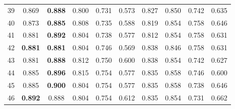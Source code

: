 \begin{table}[]
\begin{tabular}{|c|ccccccccc|}
39   & 0.869                            & \textbf{0.888}               & 0.800                              & 0.731                             & 0.573                    & 0.827                             & 0.850                             & 0.742                            & 0.635                       \\ \cline{1-1}
40   & 0.873                            & \textbf{0.885}               & 0.808                              & 0.735                             & 0.588                    & 0.819                             & 0.854                             & 0.758                            & 0.646                       \\ \cline{1-1}
41   & 0.881                            & \textbf{0.892}               & 0.804                              & 0.738                             & 0.577                    & 0.812                             & 0.854                             & 0.758                            & 0.631                       \\ \cline{1-1}
42   & \textbf{0.881}                   & \textbf{0.881}               & 0.804                              & 0.746                             & 0.569                    & 0.838                             & 0.846                             & 0.758                            & 0.631                       \\ \hline
43   & 0.881                            & \textbf{0.888}               & 0.812                              & 0.750                             & 0.600                    & 0.838                             & 0.854                             & 0.742                            & 0.627                       \\ \cline{1-1}
44   & 0.885                            & \textbf{0.896}               & 0.815                              & 0.754                             & 0.577                    & 0.835                             & 0.858                             & 0.746                            & 0.600                       \\ \cline{1-1}
45   & 0.885                            & \textbf{0.900}               & 0.804                              & 0.754                             & 0.577                    & 0.835                             & 0.858                             & 0.738                            & 0.646                       \\ \cline{1-1}
46   & \textbf{0.892}                   & 0.888                        & 0.804                              & 0.754                             & 0.612                    & 0.835                             & 0.854                             & 0.731                            & 0.662                       \\ \cline{1-1}

\end{tabular}
\end{table}
